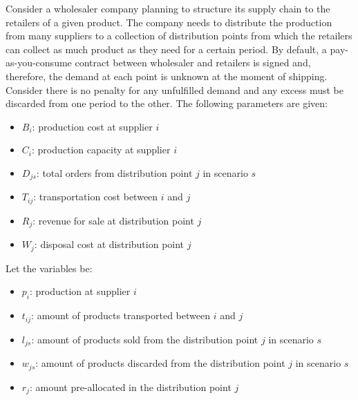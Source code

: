 Consider a wholesaler company planning to structure its supply chain to the retailers of a given product. The company needs to distribute the production from many suppliers to a collection of distribution points from which the retailers can collect as much product as they need for a certain period. By default, a pay-as-you-consume contract between wholesaler and retailers is signed and, therefore, the demand at each point is unknown at the moment of shipping. Consider there is no penalty for any unfulfilled demand and any excess must be discarded from one period to the other. The following parameters are given:

\begin{itemize}
	\item $B_i$: production cost at supplier $i$
	\item $C_i$: production capacity at supplier $i$
	\item $D_{js}$: total orders from distribution point $j$ in scenario $s$
	\item $T_{ij}$: transportation cost between $i$ and $j$
	\item $R_j$: revenue for sale at distribution point $j$
	\item $W_j$: disposal cost at distribution point $j$
\end{itemize}

Let the variables be:

\begin{itemize}
	\item $p_i$: production at supplier $i$
	\item $t_{ij}$: amount of products transported between $i$ and $j$
	\item $l_{js}$: amount of products sold from the distribution point $j$ in scenario $s$
	\item $w_{js}$: amount of products discarded from the distribution point $j$ in scenario $s$
	\item $r_j$: amount pre-allocated in the distribution point $j$
\end{itemize}

